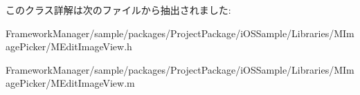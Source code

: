 このクラス詳解は次のファイルから抽出されました\+:\begin{DoxyCompactItemize}
\item 
Framework\+Manager/sample/packages/\+Project\+Package/i\+O\+S\+Sample/\+Libraries/\+M\+Image\+Picker/M\+Edit\+Image\+View.\+h\item 
Framework\+Manager/sample/packages/\+Project\+Package/i\+O\+S\+Sample/\+Libraries/\+M\+Image\+Picker/M\+Edit\+Image\+View.\+m\end{DoxyCompactItemize}

